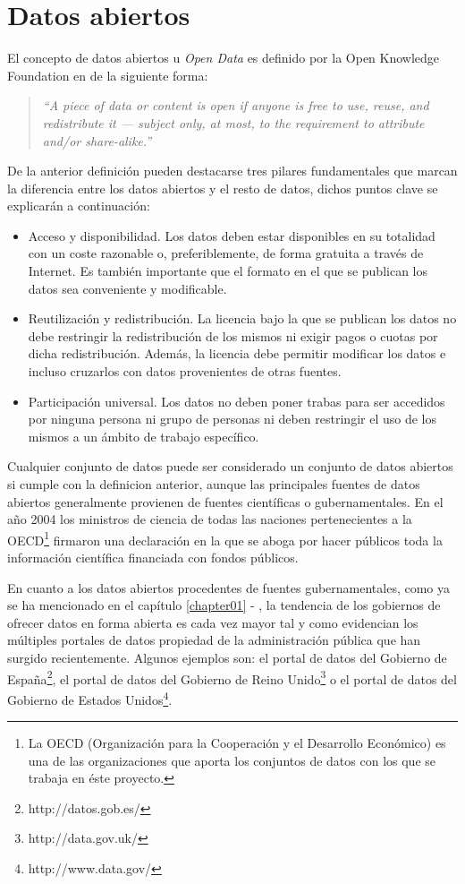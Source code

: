 \section{Datos abiertos}
El concepto de datos abiertos u \textit{Open Data} es definido por la Open Knowledge Foundation en \cite{opendefinition} de la siguiente forma:
\begin{quote}
\textit{``A piece of data or content is open if anyone is free to use, reuse, and redistribute it — subject only, at most, to the requirement to attribute and/or share-alike.''}
\end{quote}

De la anterior definición pueden destacarse tres pilares fundamentales que marcan la diferencia entre los datos abiertos y el resto de datos, dichos puntos clave se explicarán a continuación:
\begin{itemize}
\item Acceso y disponibilidad. Los datos deben estar disponibles en su totalidad con un coste razonable o, preferiblemente, de forma gratuita a través de Internet.  Es también importante que el formato en el que se publican los datos sea conveniente y modificable.
\item Reutilización y redistribución.  La licencia bajo la que se publican los datos no debe restringir la redistribución de los mismos ni exigir pagos o cuotas por dicha redistribución.  Además, la licencia debe permitir modificar los datos e incluso cruzarlos con datos provenientes de otras fuentes.
\item Participación universal.  Los datos no deben poner trabas para ser accedidos por ninguna persona ni grupo de personas ni deben restringir el uso de los mismos a un ámbito de trabajo específico.
\end{itemize}

Cualquier conjunto de datos puede ser considerado un conjunto de datos abiertos si cumple con la definicion anterior, aunque las principales fuentes de datos abiertos generalmente provienen de fuentes científicas o gubernamentales.  En el año 2004 los ministros de ciencia de todas las naciones pertenecientes a la OECD\footnote{La OECD (Organización para la Cooperación y el Desarrollo Económico) es una de las organizaciones que aporta los conjuntos de datos con los que se trabaja en éste proyecto.} firmaron una declaración en la que se aboga por hacer públicos toda la información científica financiada con fondos públicos.

En cuanto a los datos abiertos procedentes de fuentes gubernamentales, como ya se ha mencionado en el capítulo \ref{chapter01} - , la tendencia de los gobiernos de ofrecer datos en forma abierta es cada vez mayor tal y como evidencian los múltiples portales de datos propiedad de la administración pública que han surgido recientemente. Algunos ejemplos son: el portal de datos del Gobierno de España\footnote{http://datos.gob.es/}, el portal de datos del Gobierno de Reino Unido\footnote{http://data.gov.uk/} o el portal de datos del Gobierno de Estados Unidos\footnote{http://www.data.gov/}.



